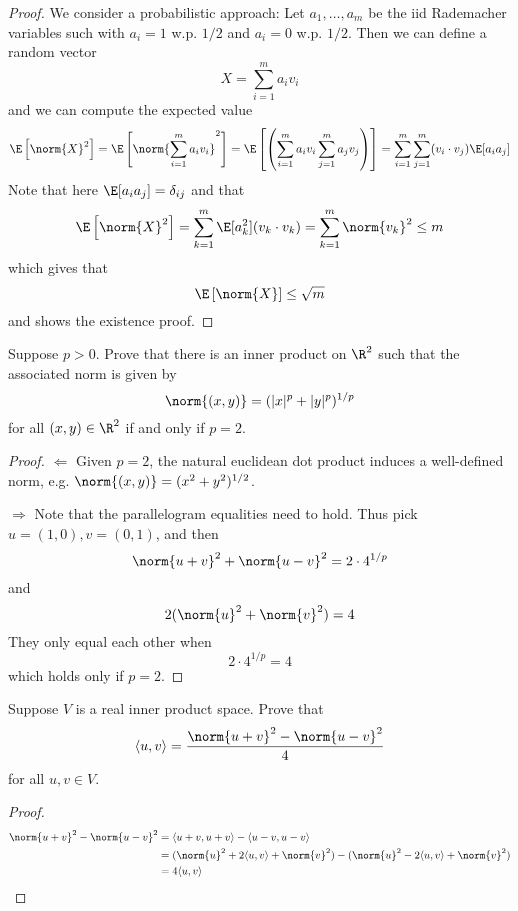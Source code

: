 \documentclass{extarticle}
\begin{document}
\begin{proof}
We consider a probabilistic approach: Let \(a_1, \ldots, a_m\) be the iid Rademacher variables 
such with \(a_i = 1\) w.p. \(1/2\) and \(a_i = 0\) w.p. \(1/2\). Then we can define a random 
vector 
\[X = \sum_{i=1}^{m}a_i v_i\] 
and we can compute the expected value  
\[\E \left[\norm{X}^2 \right] 
= \E \left[ \norm{\sum_{i=1}^{m} a_i v_i} ^2 \right] 
= \E \left[ \left(\sum_{i=1}^{m} a_i v_i \sum_{j=1}^{m}a_j v_j \right) \right] 
=  \sum_{i=1}^{m} \sum_{j=1}^{m} (v_i \cdot v_j) \E [a_i a_j]\]
Note that here \(\E[a_i a_j] = \delta_{ij}\) and that 
\[\E \left[\norm{X}^2 \right]  = \sum_{k=1}^{m} \E[a_k^2](v_k \cdot v_k) = \sum_{k=1}^{m} \norm{v_k}^2 \leq m\]
which gives that 
\[\E \left[\norm{X} \right]  \leq \sqrt{m}\]
and shows the existence proof.
\end{proof}

\begin{problem}{25}
    Suppose \(p > 0\). Prove that there is an inner product on \(\R^2\) such that the associated norm 
    is given by 
    \[\norm{(x, y)} = (|x|^p + |y|^{p})^{1/p}\]
    for all \((x,y) \in \R^2\) if and only if \(p = 2\). 
\end{problem}

\begin{proof}
\(\Leftarrow\) Given \(p = 2\), the natural euclidean dot product induces a well-defined norm, e.g. 
\(\norm{(x,y)} = (x^2 + y^2)^{1/2}\). 

\(\Rightarrow\) Note that the parallelogram equalities need to hold. Thus pick \(u = (1,0), v = (0, 1)\), 
and then 
\[\norm{u + v}^2 + \norm{u - v}^2 = 2\cdot4^{1/p} \]
and 
\[2(\norm{u}^2 + \norm{v}^2) = 4\]
They only equal each other when 
\[2 \cdot 4^{1/p} = 4\]
which holds only if \(p = 2\).
\end{proof}

\begin{problem}{26}
    Suppose \(V\) is a real inner product space. Prove that 
    \[\langle u,v \rangle = \frac{\norm{u + v}^2 - \norm{u - v}^2}{4}\]
    for all \(u, v \in V\). 
\end{problem}

\begin{proof}
\begin{align*}
    \norm{u + v}^2 - \norm{u - v}^2 
    &= \langle u+v,u+v \rangle - \langle u-v,u-v \rangle \\ 
    &= (\norm{u}^2 + 2 \langle u,v \rangle + \norm{v}^2) - (\norm{u}^2 - 2 \langle u,v \rangle + \norm{v}^2) \\ 
    &= 4 \langle u,v \rangle
\end{align*}
\end{proof}
\end{document}
